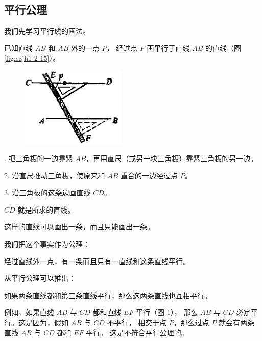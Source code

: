 \subsection{平行公理}\label{subsec:czjh1-2-5}

我们先学习平行线的画法。

已知直线 $AB$ 和 $AB$ 外的一点 $P$， 经过点 $P$ 画平行于直线 $AB$ 的直线（图 \ref{fig:czjh1-2-15}）。

\begin{figure}[htbp]
    \centering
    \begin{minipage}[b]{7cm}
        \centering
        \includegraphics[width=5cm]{../pic/czjh1-ch2-15.png}
        \caption{}\label{fig:czjh1-2-15}
    \end{minipage}
    \qquad
    \begin{minipage}[b]{7cm}
        \centering
        
        \caption{}\label{fig:czjh1-2-16}
    \end{minipage}
\end{figure}

. 把三角板的一边靠紧 $AB$，再用直尺（或另一块三角板）靠紧三角板的另一边。

2. 沿直尺推动三角板，使原来和 $AB$ 重合的一边经过点 $P$。

3. 沿三角板的这条边画直线 $CD$。

$CD$ 就是所求的直线。

这样的直线可以画出一条，而且只能画出一条。

我们把这个事实作为公理：

\begin{gongli}[平行公理]
    经过直线外一点，有一条而且只有一直线和这条直线平行。
\end{gongli}

从平行公理可以推出：

\begin{xingzhi}
    如果两条直线都和第三条直线平行，那么这两条直线也互相平行。
\end{xingzhi}

例如，如果直线 $AB$ 与 $CD$ 都和直线 $EF$ 平行（图 \ref{fig:czjh1-2-16}），
那么 $AB$ 与 $CD$ 必定平行。这是因为，假如 $AB$ 与 $CD$ 不平行，
相交于点 $P$，那么过点 $P$ 就会有两条直线 $AB$ 与 $CD$ 都和 $EF$ 平行。
这是不符合平行公理的。


